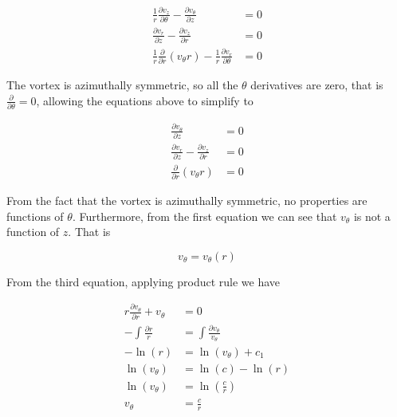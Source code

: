 \begin{equation*}
  \begin{split}
    \frac{1}{r}\frac{\partial{}v_{z}}{\partial\theta}-\frac{\partial{}v_{\theta}}{\partial{}z}&=0 \\
    \frac{\partial{}v_{r}}{\partial{}z}-\frac{\partial{}v_{z}}{\partial{}r}&=0 \\
    \frac{1}{r}\frac{\partial}{\partial{}r}(v_{\theta}r)-\frac{1}{r}\frac{\partial{}v_{r}}{\partial\theta}&=0
  \end{split}
\end{equation*}

The vortex is azimuthally symmetric, so all the $\theta$ derivatives are zero, that is $\frac{\partial}{\partial\theta}=0$, allowing the equations above to simplify to

\begin{equation*}
  \begin{split}
    \frac{\partial{}v_{\theta}}{\partial{}z}&=0 \\
    \frac{\partial{}v_{r}}{\partial{}z}-\frac{\partial{}v_{z}}{\partial{}r}&=0 \\
    \frac{\partial}{\partial{}r}(v_{\theta}r)&=0
  \end{split}
\end{equation*}

From the fact that the vortex is azimuthally symmetric, no properties are functions of $\theta$.
Furthermore, from the first equation we can see that $v_{\theta}$ is not a function of $z$.
That is

\begin{equation*}
  v_{\theta}=v_{\theta}(r)
\end{equation*}

From the third equation, applying product rule we have

\begin{equation*}
  \begin{split}
    r\frac{\partial{}v_{\theta}}{\partial{}r}+v_{\theta}&=0 \\
    -\int\frac{\partial{}r}{r}&=\int\frac{\partial{}v_{\theta}}{v_{\theta}} \\
    -\ln(r)&=\ln(v_{\theta})+c_{1} \\
    \ln(v_{\theta})&=\ln(c)-\ln(r) \\
    \ln(v_{\theta})&=\ln\left(\frac{c}{r}\right) \\
    v_{\theta}&=\frac{c}{r}
  \end{split}
\end{equation*}

